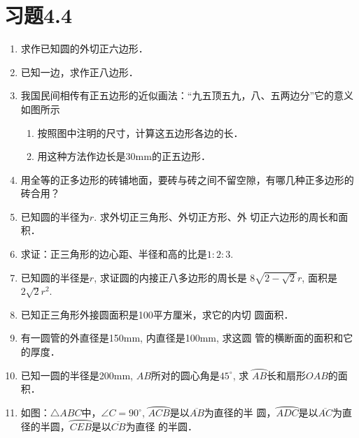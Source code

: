\section*{习题4.4}
\begin{enumerate}
    \item 求作已知圆的外切正六边形．

    \item 已知一边，求作正八边形．
    \item 我国民间相传有正五边形的近似画法：“九五顶五九，八、五两边分”它的意义如图所示
\begin{enumerate}
    \item 按照图中注明的尺寸，计算这五边形各边的长．
    \item 用这种方法作边长是30mm的正五边形．
\end{enumerate}

\begin{figure}[htp]
    \centering
    \caption{}
\end{figure}

\item 用全等的正多边形的砖铺地面，要砖与砖之间不留空隙，有哪几种正多边形的砖合用？
\item 已知圆的半径为$r$. 求外切正三角形、外切正方形、外
切正六边形的周长和面积．
\item 求证：正三角形的边心距、半径和高的比是$1:2:3$.
\item 已知圆的半径是$r$, 求证圆的内接正八多边形的周长是
$8\sqrt{2-\sqrt{2}}r$, 面积是$2\sqrt{2}r^2$.
\item 已知正三角形外接圆面积是100平方厘米，求它的内切
圆面积．
\item 有一圆管的外直径是150mm, 内直径是100mm, 求这圆
管的横断面的面积和它的厚度．
\item 已知一圆的半径是200mm, $AB$所对的圆心角是$45^{\circ}$, 求
$\wideparen{AB}$长和扇形$OAB$的面积．
\item 如图：$\triangle ABC$中，$\angle C=90^{\circ}$, $\wideparen{ACB}$是以$\overline{AB}$为直径的半
圆，$\wideparen{ADC}$是以$\overline{AC}$为直径的半圆，$\wideparen{CEB}$是以$\overline{CB}$为直径
的半圆．


\end{enumerate}
